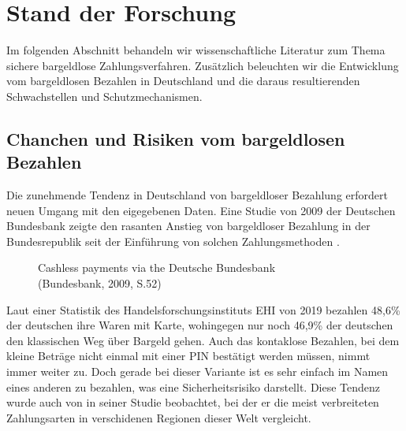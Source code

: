 \section{Stand der Forschung}

Im folgenden Abschnitt behandeln wir wissenschaftliche Literatur zum Thema sichere bargeldlose
Zahlungsverfahren. Zusätzlich beleuchten wir die Entwicklung vom bargeldlosen Bezahlen in Deutschland 
und die daraus resultierenden Schwachstellen und Schutzmechanismen.


\subsection{Chanchen und Risiken vom bargeldlosen Bezahlen}

Die zunehmende Tendenz in Deutschland von bargeldloser Bezahlung erfordert neuen Umgang mit den 
eigegebenen Daten. Eine Studie von 2009 der Deutschen Bundesbank zeigte den rasanten Anstieg von 
bargeldloser Bezahlung in der Bundesrepublik seit der Einführung von solchen Zahlungsmethoden 
\cite{refrep:DBCP}.

\begin{figure}[htb]
    \caption{Cashless payments via the Deutsche Bundesbank\\ (Bundesbank, 2009, S.52)}
    \label{fig:refrep_DB}
\end{figure}


Laut einer Statistik des Handelsforschungsinstituts EHI von 2019 \cite{refart:KSDL} bezahlen 48,6\% 
der deutschen ihre Waren mit Karte, wohingegen nur noch 46,9\% der deutschen den klassischen 
Weg über Bargeld gehen. Auch das kontaklose Bezahlen, bei dem kleine Beträge nicht einmal mit einer 
PIN bestätigt werden müssen, nimmt immer weiter zu. Doch gerade bei dieser Variante ist es sehr einfach
im Namen eines anderen zu bezahlen, was eine Sicherheitsrisiko darstellt. Diese Tendenz wurde auch
von \cite{refart:TDMP} in seiner Studie beobachtet, bei der er die meist verbreiteten Zahlungsarten
in verschidenen Regionen dieser Welt vergleicht. 


